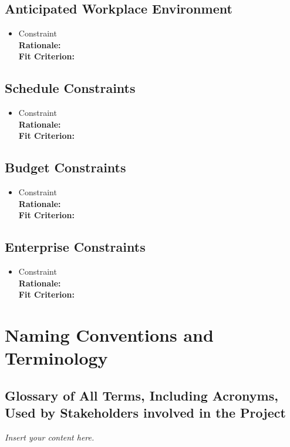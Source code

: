 \documentclass[12pt]{article}
\newcommand{\lips}{\textit{Insert your content here.}}
\begin{document}
\subsection{Anticipated Workplace Environment}
\begin{itemize}
  \item Constraint
  \\ \textbf{Rationale:} 
  \\ \textbf{Fit Criterion:} 
\end{itemize}

\subsection{Schedule Constraints}
\begin{itemize}
  \item Constraint
  \\ \textbf{Rationale:} 
  \\ \textbf{Fit Criterion:} 
\end{itemize}

\subsection{Budget Constraints}
\begin{itemize}
  \item Constraint
  \\ \textbf{Rationale:} 
  \\ \textbf{Fit Criterion:} 
\end{itemize}

\subsection{Enterprise Constraints}
\begin{itemize}
  \item Constraint
  \\ \textbf{Rationale:} 
  \\ \textbf{Fit Criterion:} 
\end{itemize}

\section{Naming Conventions and Terminology}
\subsection{Glossary of All Terms, Including Acronyms, Used by Stakeholders
involved in the Project}
\lips
\end{document}
